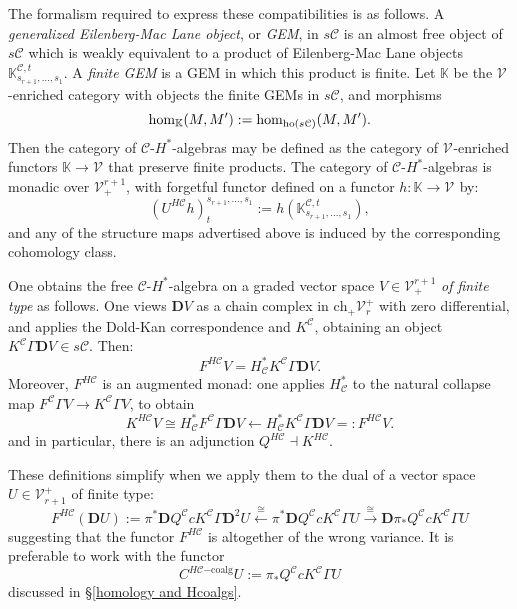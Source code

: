 \documentclass[11pt]{amsart} \renewcommand{\baselinestretch}{1.4}
\theoremstyle{plain}
\theoremstyle{definition}
\renewcommand{\to}{\longrightarrow}
\newcommand{\from}{\longleftarrow}
\newcommand{\calV}{\mathcal{V}}
\newcommand{\calc}{\mathcal{C}}
\newcommand{\vect}[2]{\calV^{#1}_{#2}}
\newcommand{\HA}[1]{H#1}
\newcommand{\HC}[1]{H#1\mathrm{-coalg}}
\newcommand{\complexes}{\mathrm{ch}_+}
\newcommand{\dual}{\mathbf{D}}
\begin{document}
\begin{Pi-algebras and cohomology algebras}
The formalism required to express these compatibilities is as follows. A \emph{generalized Eilenberg-Mac Lane object}, or \emph{GEM}, in $s\calc$ is an almost free object of $s\calc$ which is weakly equivalent to a product of Eilenberg-Mac Lane objects  $\mathbb{K}_{s_{r+1},\ldots,s_{1}}^{\calc,t}$. A \emph{finite GEM} is a GEM in which this product is finite. Let $\mathbb{K}$  be the $\vect{}{}$-enriched category with objects the finite GEMs in $s\calc$, and morphisms
\[\hom_{\mathbb{K}}(M,M'):=\hom_{\textup{ho}(s\calc)}(M,M').\]
Then the category of $\calc$-$H^*$-algebras  may be defined as the category of $\vect{}{}$-enriched functors $\mathbb{K}\to \vect{}{}$ that preserve finite products. The category of $\calc$-$H^*$-algebras is monadic over $\vect{r+1}{+}$, with forgetful functor defined  on a functor $h:\mathbb{K}\to \vect{}{}$  by:%
\[(U^{\HA{\calc}}h)_t^{s_{r+1},\ldots,s_1}:=h(\mathbb{K}_{s_{r+1},\ldots,s_{1}}^{\calc,t}),\]
and any of the structure maps advertised above is induced by the corresponding cohomology class. %

One obtains the free $\calc$-$H^*$-algebra on a graded vector space $V\in \vect{r+1}{+}$ \emph{of finite type} as follows. One views $\dual V$ as a chain complex in $\complexes\vect{+}{r}$ with zero differential, and applies the Dold-Kan correspondence and $K^\calc$, obtaining an object $K^\calc\Gamma \dual V\in s\calc$. Then:
\[F^{\HA{\calc}}V=H^*_{\calc}K^\calc\Gamma\dual V.\]
Moreover, $F^{\HA{\calc}}$ is an augmented monad: one applies $H^*_{\calc}$ to the natural collapse map $F^{\calc}\Gamma V\to K^{\calc}\Gamma V$, to obtain
\[K^{\HA{\calc}}V\cong H^*_{\calc} F^{\calc}\Gamma \dual V\from H^*_{\calc} K^{\calc}\Gamma \dual V=:F^{\HA{\calc}}V.\]
and in particular, there is an adjunction $Q^{\HA{\calc}}\dashv K^{\HA{\calc}}$.

These definitions simplify when we apply them to the dual of a vector space $U\in\vect{+}{r+1}$ of finite type:
\[F^{\HA{\calc}}(\dual U):= \pi^*\dual Q^{\calc}cK^\calc\Gamma \dual^{2}U\overset{\cong}{\from}\pi^*\dual Q^{\calc}cK^\calc\Gamma U\overset{\cong}{\to} \dual  \pi_*Q^{\calc}cK^\calc\Gamma U\]
suggesting that the functor $F^{\HA{\calc}}$ is altogether of the wrong variance. It is preferable to work with the functor
\[C^{\HC{\calc}}U:=\pi_*Q^{\calc}cK^\calc\Gamma U\]
discussed in \S\ref{homology and Hcoalgs}.




\end{Pi-algebras and cohomology algebras}
\end{document}
